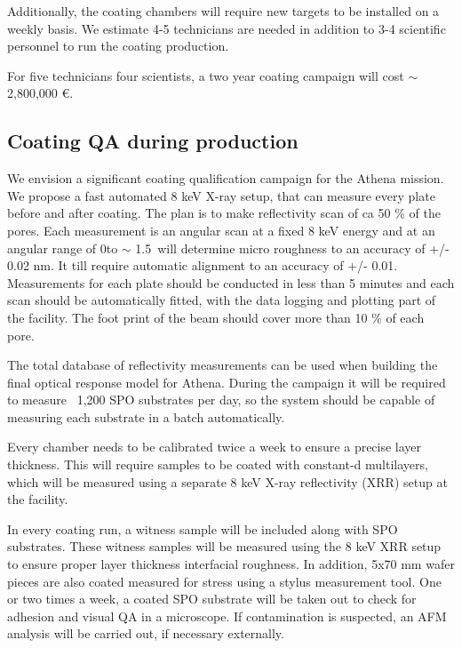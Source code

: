 Additionally, the coating chambers will require new targets to be installed on a weekly basis. We estimate 4-5 technicians are needed in addition to 3-4 scientific personnel to run the coating production.

For five technicians four scientists, a two year coating campaign will cost $\sim$2,800,000 \euro.


\subsection{Coating QA during production}\label{qualification}
We envision a significant coating qualification campaign for the Athena mission. We propose a fast automated 8 keV X-ray setup, that can measure every plate before and after coating. The plan is to make reflectivity scan of ca 50 \% of the pores.  Each measurement is an angular scan  at a fixed 8 keV energy and at an angular range of 0\degr to $\sim$ 1.5\degr\ will determine micro roughness to an accuracy of +/- 0.02 nm. It till require automatic alignment to an accuracy of +/- 0.01\degr. Measurements for each plate should be conducted in less than 5 minutes and each scan should be automatically fitted, with the data logging and plotting part of the facility. The foot print of the beam should cover more than 10 \% of each pore.

The total database of reflectivity measurements can be used when building the final optical response model for Athena. During the campaign it will be required to measure ~1,200 SPO substrates per day, so the system should be capable of measuring each substrate in a batch automatically.

Every chamber needs to be calibrated twice a week to ensure a precise layer thickness. This will require samples to be coated with constant-d multilayers, which will be measured using a separate 8 keV X-ray reflectivity (XRR) setup at the facility.

In every coating run, a witness sample will be included along with SPO substrates. These witness samples will be measured using the 8 keV XRR setup to ensure proper layer thickness interfacial roughness. In addition, 5x70 mm wafer pieces are also coated measured for stress using a stylus measurement tool. One or two times a week, a coated SPO substrate will be taken out to check for adhesion and visual QA in a microscope. If contamination is suspected, an AFM analysis will be carried out, if necessary externally.

